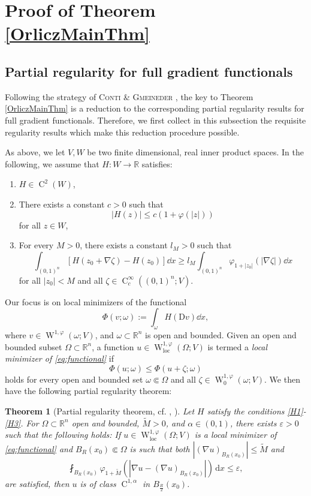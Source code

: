\documentclass[a4paper,11pt]{amsart}
\numberwithin{equation}{section}
\newcommand{\R}{\mathbb{R}}
\newcommand{\sobo}{\operatorname{W}}
\newcommand{\hold}{\operatorname{C}}
\newtheorem{satz}[defi]{Theorem}
\begin{document}
	\section{Proof of Theorem \ref{OrliczMainThm}}
	\label{Proof}
	\subsection{Partial regularity for full gradient functionals}
	Following the strategy of \textsc{Conti \& Gmeineder} \cite{contiFXG,gmeineder_partial_2021}, the key to Theorem \ref{OrliczMainThm} is a reduction to the corresponding partial regularity results for full gradient functionals. Therefore, we first collect in this subsection the requisite regularity results which make this reduction procedure possible. 
	
	As above, we let $V,W$ be two finite dimensional, real inner product spaces. In the following, we assume that $H: W \to \R$ satisfies:
	\begin{enumerate}[(H1)]
		\item $H \in \hold^2(W)$, \label{H1}
		\item There exists a constant $c > 0$ such that $$|H(z)| \leq c(1+\varphi(|z|))$$ for all $z \in W$, \label{H2}
		\item For every $M > 0$, there exists a constant $l_M > 0$ such that
		\[
		\int_{(0,1)^n} \left[ H(z_0 + \nabla \zeta) - H(z_0) \right] \dd{x} \geq l_M \int_{(0,1)^n} \varphi_{1+|z_0|}(|\nabla \zeta|) \dd{x}
		\]
		for all $|z_0| < M$ and all  $\zeta \in \hold_c^\infty((0,1)^n; V)$. \label{H3}
	\end{enumerate}
	Our focus is on local minimizers of the functional
	\begin{equation}
		\Phi(v; \omega) := \int_\omega H(\mathrm{D} v) \dd{x}, \label{eq:functional}
	\end{equation}
	where $v \in \sobo^{1,\varphi}(\omega; V)$, and $\omega\subset\R^{n}$ is open and bounded. Given an open and bounded subset $\Omega\subset\R^{n}$, a function $u \in \sobo_\text{loc}^{1,\varphi}(\Omega; V)$ is termed a \emph{local minimizer of \eqref{eq:functional}} if
	\begin{equation}
		\Phi(u; \omega) \leq \Phi(u + \zeta; \omega) \label{loc:min}
	\end{equation}
	holds for every open and bounded set ${\omega} \Subset \Omega$ and all $\zeta \in \sobo_{0}^{1,\varphi}(\omega;V)$. 
	We then have the following partial regularity theorem: 
	\begin{satz}[{{Partial regularity theorem, cf. \cite[Theorem 1.2]{Irving2021partial}, \cite{diening_partial_2012}}}]
		\label{thm:IrvMainReg}
		Let $H$ satisfy the conditions \ref{H1}-\ref{H3}. For $\Omega \subset \mathbb{R}^n$ open and bounded, $\widetilde{M} > 0$, and  $\alpha \in (0,1)$, there exists $\varepsilon > 0$ such that the following holds: If $u \in \sobo_\mathrm{loc}^{1, \varphi}(\Omega; V)$ is a local minimizer of \eqref{eq:functional} and $B_R(x_0) \Subset \Omega$ is such that both $|(\nabla u)_{B_R(x_0)}| \leq \widetilde{M}$ and 
		\[
		\fint_{B_R(x_0)} \varphi_{1+\widetilde{M}} (|\nabla u - (\nabla u)_{B_R(x_0)}|) \, \mathrm{d}x \leq \varepsilon,
		\] 
		are satisfied, 
		then $u$ is of class $\hold^{1, \alpha}$ in $B_{\frac{R}{2}}(x_0)$.
	\end{satz}
\end{document}
